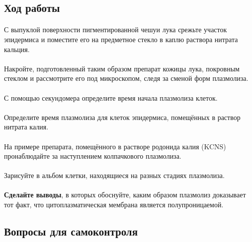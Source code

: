 \subsection*{Ход работы}

\paragraph*{}С выпуклой поверхности пигментированной чешуи лука срежьте участок эпидермиса и поместите его на предметное стекло в каплю раствора нитрата кальция. 

\paragraph*{}Накройте, подготовленный таким образом препарат кожицы лука, покровным стеклом и рассмотрите его под микроскопом, следя за сменой форм плазмолиза. 

\paragraph*{}С помощью секундомера определите время начала плазмолиза клеток.

\paragraph*{}Определите время плазмолиза для клеток эпидермиса, помещённых в раствор нитрата калия.

\paragraph*{}На примере препарата, помещённого в растворе родонида калия (KCNS) пронаблюдайте за наступлением колпачкового плазмолиза. 

\paragraph*{}Зарисуйте в альбом клетки, находящиеся на разных стадиях плазмолиза.

\paragraph*{}\textbf{Сделайте выводы}, в которых обоснуйте, каким образом плазмолиз доказывает тот факт, что цитоплазматическая мембрана является полупроницаемой.

\subsection*{Вопросы для самоконтроля}

